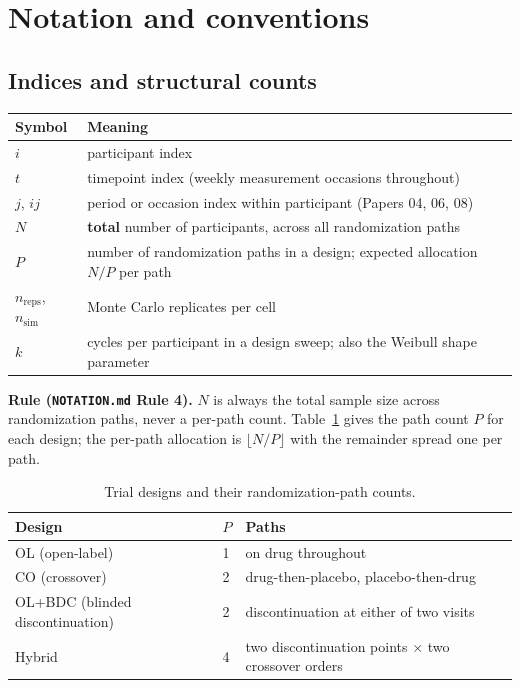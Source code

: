 \documentclass[11pt]{article}
\newcommand{\code}[1]{\texttt{#1}}
\begin{document}
\section{Notation and conventions}
\label{sec:notation}

\subsection{Indices and structural counts}

\begin{center}
\begin{tabular}{@{}ll@{}}
\toprule
Symbol & Meaning \\
\midrule
$i$ & participant index \\
$t$ & timepoint index (weekly measurement occasions throughout) \\
$j$, $ij$ & period or occasion index within participant (Papers 04, 06, 08) \\
$N$ & \textbf{total} number of participants, across all randomization paths \\
$P$ & number of randomization paths in a design; expected allocation $N/P$ per path \\
$n_{\mathrm{reps}}$, $n_{\mathrm{sim}}$ & Monte Carlo replicates per cell \\
$k$ & cycles per participant in a design sweep; also the Weibull shape parameter \\
\bottomrule
\end{tabular}
\end{center}

\textbf{Rule (\code{NOTATION.md} Rule 4).} $N$ is always the total
sample size across randomization paths, never a per-path count.
Table~\ref{tab:paths} gives the path count $P$ for each design; the
per-path allocation is $\lfloor N/P \rfloor$ with the remainder spread
one per path.

\begin{table}[h]
\centering
\caption{Trial designs and their randomization-path counts.}
\label{tab:paths}
\begin{tabular}{@{}lll@{}}
\toprule
Design & $P$ & Paths \\
\midrule
OL (open-label) & 1 & on drug throughout \\
CO (crossover) & 2 & drug-then-placebo, placebo-then-drug \\
OL+BDC (blinded discontinuation) & 2 & discontinuation at either of two visits \\
Hybrid & 4 & two discontinuation points $\times$ two crossover orders \\
\bottomrule
\end{tabular}
\end{table}
\end{document}
